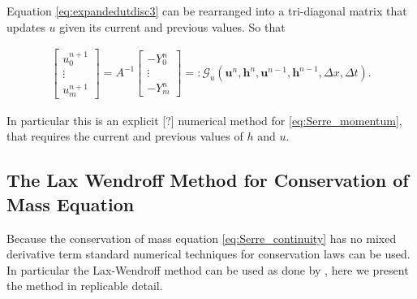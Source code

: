 \documentclass[SingleSpace,12pt,Journal]{Serre_ASCE}
\begin{document}
Equation \eqref{eq:expandedutdisc3} can be rearranged into a tri-diagonal matrix that updates $u$ given its current and previous values. So that
\begin{linenomath*}
\begin{gather}
\left[\begin{array}{c}
 u^{n+1}_0 \\
 \vdots \\
 u^{n+1}_m \end{array}\right]
 = A^{-1} \left[\begin{array}{c}
  -Y^n_0 \\
  \vdots \\
  -Y^n_m \end{array}\right] =: \mathcal{G}_u\left(\boldsymbol{u}^n,\boldsymbol{h}^n, \boldsymbol{u}^{n-1},\boldsymbol{h}^{n-1}, \Delta x, \Delta t \right).
\label{eq:FDcentforu}
\end{gather}
\end{linenomath*}
In particular this is an explicit [?] numerical method for \eqref{eq:Serre_momentum}, that requires the current and previous values of $h$ and $u$.


\subsection{The Lax Wendroff Method for Conservation of Mass Equation}
\label{section:}
Because the conservation of mass equation \eqref{eq:Serre_continuity} has no mixed derivative term standard numerical techniques for conservation laws can be used. In particular the Lax-Wendroff method can be used as done by , here we present the method in replicable detail.
\end{document}
